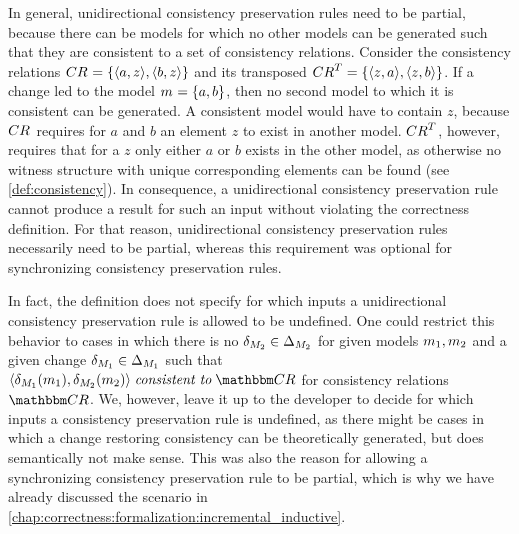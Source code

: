 In general, unidirectional consistency preservation rules need to be partial, because there can be models for which no other models can be generated such that they are consistent to a set of consistency relations.
Consider the consistency relations $\consistencyrelation{CR}{} = \setted{\tupled{a, z}, \tupled{b, z}}$ and its transposed $\consistencyrelation{CR}{}^T = \setted{\tupled{z, a}, \tupled{z, b}}$.
If a change led to the model $\model{m}{} = \setted{a, b}$, then no second model to which it is consistent can be generated.
A consistent model would have to contain $z$, because $\consistencyrelation{CR}{}$ requires for $a$ and $b$ an element $z$ to exist in another model.
$\consistencyrelation{CR}{}^T$, however, requires that for a $z$ only either $a$ or $b$ exists in the other model, as otherwise no witness structure with unique corresponding elements can be found (see \autoref{def:consistency}).
In consequence, a unidirectional consistency preservation rule cannot produce a result for such an input without violating the correctness definition.
For that reason, unidirectional consistency preservation rules necessarily need to be partial, whereas this requirement was optional for synchronizing consistency preservation rules.

In fact, the definition does not specify for which inputs a unidirectional consistency preservation rule is allowed to be undefined.
One could restrict this behavior to cases in which there is no $\change{\metamodel{M}{2}} \in \changeuniverse{\metamodel{M}{2}}$ for given models $\model{m}{1},\model{m}{2}$ and a given change $\change{\metamodel{M}{1}} \in \changeuniverse{\metamodel{M}{1}}$ such that $\tupled{\change{\metamodel{M}{1}}(\model{m}{1}), \change{\metamodel{M}{2}}(\model{m}{2})} \consistenttomath \consistencyrelationset{CR}$ for consistency relations $\consistencyrelationset{CR}$.
We, however, leave it up to the developer to decide for which inputs a consistency preservation rule is undefined, as there might be cases in which a change restoring consistency can be theoretically generated, but does semantically not make sense.
This was also the reason for allowing a synchronizing consistency preservation rule to be partial, which is why we have already discussed the scenario in \autoref{chap:correctness:formalization:incremental_inductive}.


